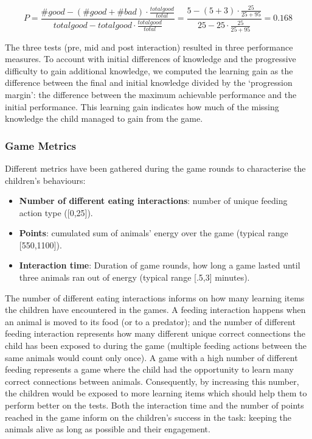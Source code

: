 \begin{equation}
P=\frac{\#good-(\#good+\#bad) \cdot \frac{total good}{total}}{total good - total good \cdot \frac{total good}{total}} = \frac{5-(5+3) \cdot \frac{25}{25+95}}{25 - 25 \cdot \frac{25}{25+95}}=0.168
\end{equation}
			
The three tests (pre, mid and post interaction) resulted in three performance measures. To account with initial differences of knowledge and the progressive difficulty to gain additional knowledge, we computed the learning gain as the difference between the final and initial knowledge divided by the `progression margin': the difference between the maximum achievable performance and the initial performance. This learning gain indicates how much of the missing knowledge the child managed to gain from the game.
			
\subsubsection{Game Metrics}
Different metrics have been gathered during the game rounds to characterise the children's behaviours:
\begin{itemize}
	\item \textbf{Number of different eating interactions}: number of unique feeding action type ([0,25]).
	\item \textbf{Points}: cumulated sum of animals' energy over the game (typical range [550,1100]).
	\item \textbf{Interaction time}: Duration of game rounds, how long a game lasted until three animals ran out of energy (typical range [.5,3] minutes).
\end{itemize}

The number of different eating interactions informs on how many learning items the children have encountered in the games. A feeding interaction happens when an animal is moved to its food (or to a predator); and the number of different feeding interaction represents how many different unique correct connections the child has been exposed to during the game (multiple feeding actions between the same animals would count only once). A game with a high number of different feeding represents a game where the child had the opportunity to learn many correct connections between animals. Consequently, by increasing this number, the children would be exposed to more learning items which should help them to perform better on the tests. Both the interaction time and the number of points reached in the game inform on the children's success in the task: keeping the animals alive as long as possible and their engagement. 

